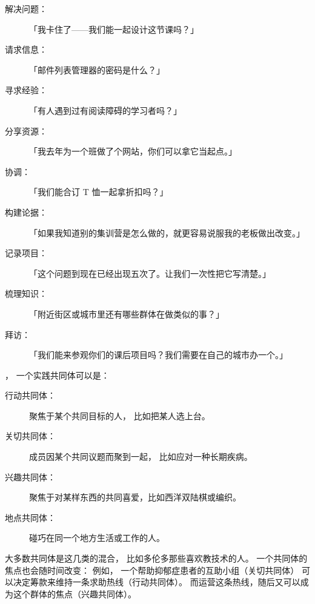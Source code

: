 \newpage
\begin{description}

\item[解决问题：]
  「我卡住了——我们能一起设计这节课吗？」

\item[请求信息：]
  「邮件列表管理器的密码是什么？」

\item[寻求经验：]
  「有人遇到过有阅读障碍的学习者吗？」

\item[分享资源：]
  「我去年为一个班做了个网站，你们可以拿它当起点。」

\item[协调：]
  「我们能合订 T 恤一起拿折扣吗？」

\item[构建论据：]
  「如果我知道别的集训营是怎么做的，就更容易说服我的老板做出改变。」

\item[记录项目：]
  「这个问题到现在已经出现五次了。让我们一次性把它写清楚。」

\item[梳理知识：]
  「附近街区或城市里还有哪些群体在做类似的事？」

\item[拜访：]
  「我们能来参观你们的课后项目吗？我们需要在自己的城市办一个。」

\end{description}

，
一个实践共同体可以是：

\begin{description}

\item[行动共同体：]
  聚焦于某个共同目标的人，
  比如把某人选上台。

\item[关切共同体：]
  成员因某个共同议题而聚到一起，
  比如应对一种长期疾病。

\item[兴趣共同体：]
  聚焦于对某样东西的共同喜爱，比如西洋双陆棋或编织。

\item[地点共同体：]
  碰巧在同一个地方生活或工作的人。

\end{description}

大多数共同体是这几类的混合，
比如多伦多那些喜欢教技术的人。
一个共同体的焦点也会随时间改变：
例如，
一个帮助抑郁症患者的互助小组（关切共同体）
可以决定筹款来维持一条求助热线（行动共同体）。
而运营这条热线，随后又可以成为这个群体的焦点（兴趣共同体）。

